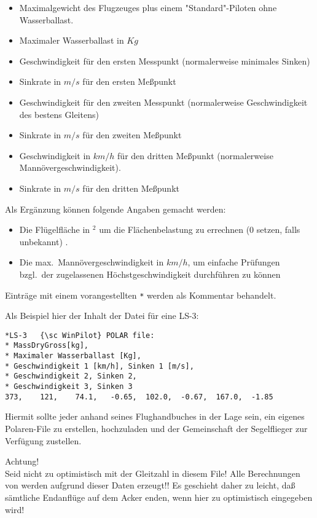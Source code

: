 \begin{itemize}
\item Maximalgewicht des Flugzeuges  plus einem "Standard"-Piloten ohne Wasserballast.
\item Maximaler Wasserballast in $Kg$
\item Geschwindigkeit für den ersten Messpunkt (normalerweise minimales Sinken)
\item Sinkrate in $m/s$ für den ersten Meßpunkt
\item Geschwindigkeit für den zweiten  Messpunkt (normalerweise Geschwindigkeit des bestens
    Gleitens)
\item Sinkrate in $m/s$ für den zweiten Meßpunkt
\item Geschwindigkeit in $km/h$ für den dritten Meßpunkt  (normalerweise Mannövergeschwindigkeit).
\item Sinkrate in $m/s$ für den dritten Meßpunkt
\end{itemize}

Als Ergänzung können folgende Angaben gemacht werden:
\begin{itemize}
\item Die Flügelfläche in $^2$ um die Flächenbelastung zu errechnen  (0 setzen, falls unbekannt) .
\item Die max.\  Mannövergeschwindigkeit in $km/h$, um einfache Prüfungen bzgl.\
 der zugelassenen Höchstgeschwindigkeit durchführen zu können
\end{itemize}

Einträge mit einem vorangestellten \verb|*| werden als Kommentar behandelt.

Als Beispiel hier der Inhalt der Datei für eine LS-3:
\begin{verbatim}
*LS-3	{\sc WinPilot} POLAR file:
* MassDryGross[kg],
* Maximaler Wasserballast [Kg],
* Geschwindigkeit 1 [km/h], Sinken 1 [m/s],
* Geschwindigkeit 2, Sinken 2,
* Geschwindigkeit 3, Sinken 3  	
373,	121,	74.1,	-0.65,	102.0,	-0.67,	167.0,	-1.85
\end{verbatim}

Hiermit sollte jeder anhand seines Flughandbuches in der Lage sein, ein eigenes Polaren-File zu
erstellen, hochzuladen  und der Gemeinschaft der Segelflieger zur Verfügung zustellen.

Achtung!\\
Seid nicht zu optimistisch mit der Gleitzahl in diesem File!
\tip Alle Berechnungen von  \xc werden aufgrund dieser Daten erzeugt!!  Es geschieht daher zu
leicht, daß sämtliche Endanflüge auf dem Acker enden, wenn hier zu optimistisch
eingegeben wird!


